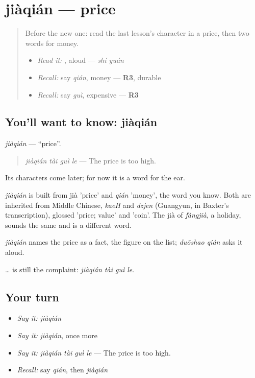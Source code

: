 \section[jiàqián]{jiàqián — price}

\label{lesson:ZH-C156-jiaqian}



\begin{quote}
Before the new one: read the last lesson's character in a price, then two words for money.

\begin{itemize}
\raggedright
  \item \emph{Read it:} , aloud — \emph{shí yuán}
  \item \emph{Recall:} say \emph{qián}, money — \textbf{R3}, durable
  \item \emph{Recall:} say \emph{guì}, expensive — \textbf{R3}
\end{itemize}
\end{quote}

\subsection*{You'll want to know: jiàqián}
\emph{jiàqián} — \textquotedblleft{}price\textquotedblright{}.

\begin{quote}
\emph{jiàqián tài guì le} — The price is too high.
\end{quote}

Its characters come later; for now it is a word for the ear.

\begin{cousinweb}
\emph{jiàqián} is built from jià 'price' and \emph{qián} 'money', the word you know. Both are inherited from Middle Chinese, \emph{kaeH} and \emph{dzjen} (Guangyun, in Baxter's transcription), glossed 'price; value' and 'coin'. The jià of \emph{fàngjià}, a holiday, sounds the same and is a different word.
\end{cousinweb}

\begin{grammarlens}[title={What you've built}]
\emph{jiàqián} names the price as a fact, the figure on the list; \emph{duōshao qián} asks it aloud.

 …  is still the complaint: \emph{jiàqián tài guì le}.
\end{grammarlens}

\subsection*{Your turn}
\begin{itemize}
\raggedright
  \item \emph{Say it:} \emph{jiàqián}
  \item \emph{Say it:} \emph{jiàqián}, once more
  \item \emph{Say it:} \emph{jiàqián tài guì le} — The price is too high.
  \item \emph{Recall:} say \emph{qián}, then \emph{jiàqián}
\end{itemize}

